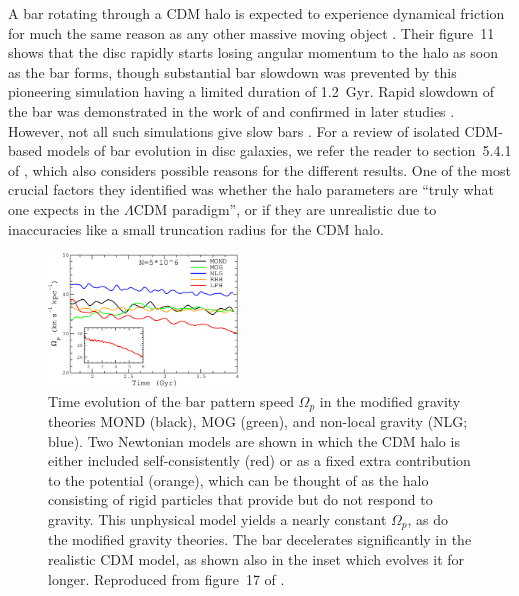 \documentclass[fleqn,usenatbib,useAMS]{mnras} %
\begin{document}
A bar rotating through a CDM halo is expected to experience dynamical friction for much the same reason as any other massive moving object \citep{Sellwood_1980}. Their figure~11 shows that the disc rapidly starts losing angular momentum to the halo as soon as the bar forms, though substantial bar slowdown was prevented by this pioneering simulation having a limited duration of 1.2~Gyr. Rapid slowdown of the bar was demonstrated in the work of \citet{Weinberg_1985} and confirmed in later studies \citep{Debattista_1998, Debattista_2000, Holley_2005, Klypin_2009}. However, not all such simulations give slow bars \citep[e.g.][]{Athanassoula_2003, Athanassoula_2013}. For a review of isolated CDM-based models of bar evolution in disc galaxies, we refer the reader to section~5.4.1 of \citet{Roshan_2021_disc_stability}, which also considers possible reasons for the different results. One of the most crucial factors they identified was whether the halo parameters are ``truly what one expects in the $\Lambda$CDM paradigm'', or if they are unrealistic due to inaccuracies like a small truncation radius for the CDM halo.

\begin{figure}
	\centering
	\includegraphics[width=0.45\textwidth]{Roshan_2021_disc_stability_Figure_17}
	\caption{Time evolution of the bar pattern speed $\Omega_p$ in the modified gravity theories MOND (black), MOG (green), and non-local gravity (NLG; blue). Two Newtonian models are shown in which the CDM halo is either included self-consistently (red) or as a fixed extra contribution to the potential (orange), which can be thought of as the halo consisting of rigid particles that provide but do not respond to gravity. This unphysical model yields a nearly constant $\Omega_p$, as do the modified gravity theories. The bar decelerates significantly in the realistic CDM model, as shown also in the inset which evolves it for longer. Reproduced from figure~17 of \citet{Roshan_2021_disc_stability}.}
	\label{Roshan_2021_disc_stability_Figure_Omega_p}
\end{figure}
\end{document}
